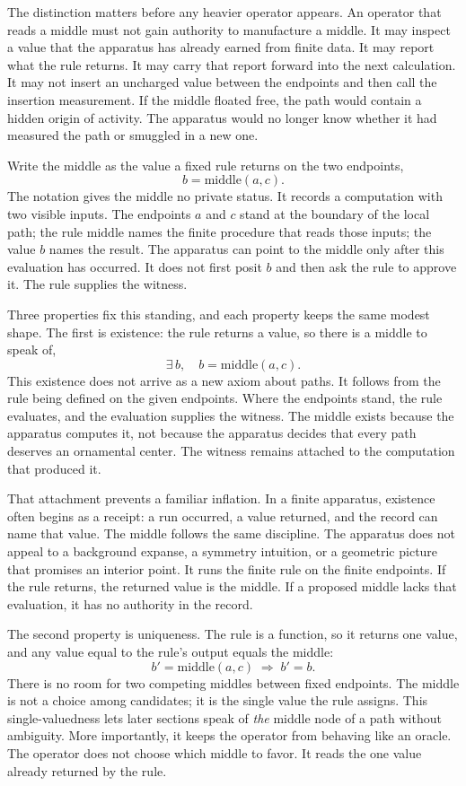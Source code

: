 The distinction matters before any heavier operator appears. An operator that
reads a middle must not gain authority to manufacture a middle. It may inspect a
value that the apparatus has already earned from finite data. It may report what
the rule returns. It may carry that report forward into the next calculation. It
may not insert an uncharged value between the endpoints and then call the
insertion measurement. If the middle floated free, the path would contain a
hidden origin of activity. The apparatus would no longer know whether it had
measured the path or smuggled in a new one.

Write the middle as the value a fixed rule returns on the two endpoints,
\[
  b = \mathrm{middle}(a,c).
\]
The notation gives the middle no private status. It records a computation with
two visible inputs. The endpoints \(a\) and \(c\) stand at the boundary of the
local path; the rule \(\mathrm{middle}\) names the finite procedure that reads
those inputs; the value \(b\) names the result. The apparatus can point to the
middle only after this evaluation has occurred. It does not first posit \(b\) and
then ask the rule to approve it. The rule supplies the witness.

Three properties fix this standing, and each property keeps the same modest
shape. The first is existence: the rule returns a value, so there is a middle to
speak of,
\[
  \exists\, b,\quad b = \mathrm{middle}(a,c).
\]
This existence does not arrive as a new axiom about paths. It follows from the
rule being defined on the given endpoints. Where the endpoints stand, the rule
evaluates, and the evaluation supplies the witness. The middle exists because the
apparatus computes it, not because the apparatus decides that every path deserves
an ornamental center. The witness remains attached to the computation that
produced it.

That attachment prevents a familiar inflation. In a finite apparatus, existence
often begins as a receipt: a run occurred, a value returned, and the record can
name that value. The middle follows the same discipline. The apparatus does not
appeal to a background expanse, a symmetry intuition, or a geometric picture
that promises an interior point. It runs the finite rule on the finite endpoints.
If the rule returns, the returned value is the middle. If a proposed middle lacks
that evaluation, it has no authority in the record.

The second property is uniqueness. The rule is a function, so it returns one
value, and any value equal to the rule's output equals the middle:
\[
  b' = \mathrm{middle}(a,c) \;\Longrightarrow\; b' = b.
\]
There is no room for two competing middles between fixed endpoints. The middle
is not a choice among candidates; it is the single value the rule assigns. This
single-valuedness lets later sections speak of \emph{the} middle node of a path
without ambiguity. More importantly, it keeps the operator from behaving like an
oracle. The operator does not choose which middle to favor. It reads the one
value already returned by the rule.

